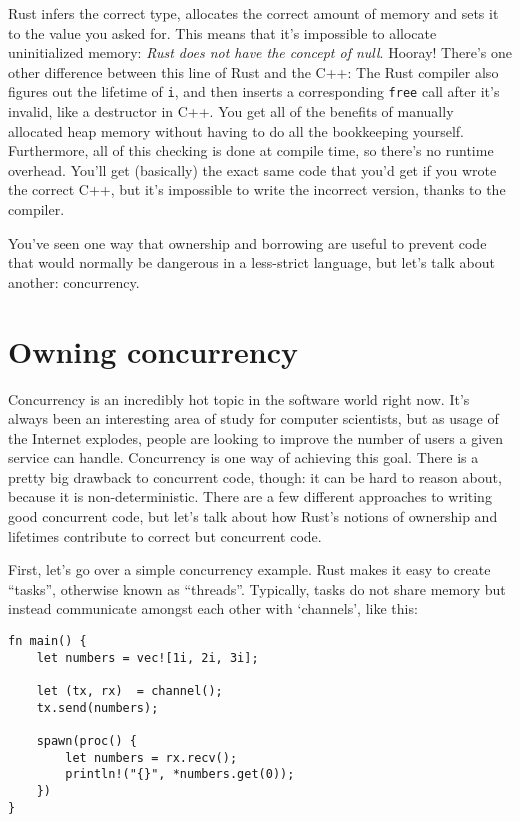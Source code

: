 \documentclass[]{article}
\begin{document}
Rust infers the correct type, allocates the correct amount of memory and
sets it to the value you asked for. This means that it's impossible to
allocate uninitialized memory: \emph{Rust does not have the concept of
null}. Hooray! There's one other difference between this line of Rust
and the C++: The Rust compiler also figures out the lifetime of
\texttt{i}, and then inserts a corresponding \texttt{free} call after
it's invalid, like a destructor in C++. You get all of the benefits of
manually allocated heap memory without having to do all the bookkeeping
yourself. Furthermore, all of this checking is done at compile time, so
there's no runtime overhead. You'll get (basically) the exact same code
that you'd get if you wrote the correct C++, but it's impossible to
write the incorrect version, thanks to the compiler.

You've seen one way that ownership and borrowing are useful to prevent
code that would normally be dangerous in a less-strict language, but
let's talk about another: concurrency.

\section{Owning concurrency}\label{owning-concurrency}

Concurrency is an incredibly hot topic in the software world right now.
It's always been an interesting area of study for computer scientists,
but as usage of the Internet explodes, people are looking to improve the
number of users a given service can handle. Concurrency is one way of
achieving this goal. There is a pretty big drawback to concurrent code,
though: it can be hard to reason about, because it is non-deterministic.
There are a few different approaches to writing good concurrent code,
but let's talk about how Rust's notions of ownership and lifetimes
contribute to correct but concurrent code.

First, let's go over a simple concurrency example. Rust makes it easy to
create ``tasks'', otherwise known as ``threads''. Typically, tasks do
not share memory but instead communicate amongst each other with
`channels', like this:

\begin{verbatim}
fn main() {
    let numbers = vec![1i, 2i, 3i];

    let (tx, rx)  = channel();
    tx.send(numbers);

    spawn(proc() {
        let numbers = rx.recv();
        println!("{}", *numbers.get(0));
    })
}
\end{verbatim}
\end{document}
